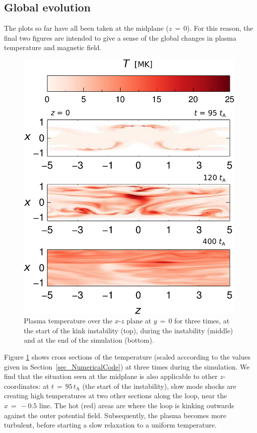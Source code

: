 \documentclass{./packages/rs/rsproca}
\begin{document}
\subsection{Global evolution}
\label{sec_NumericalResults_GlobalEvolution}

The plots so far have all been taken at the midplane ($z\,{=}\,0$). For this reason, the final two figures are intended to give a sense of the global changes in plasma temperature and magnetic field.
\begin{figure}[h!]
  \center  
  \includegraphics[scale=0.38]{./inkscape/256x256x512/xz_temp_sca}
  \caption{\small{Plasma temperature over the $x$-$z$ plane at $y\,{=}\,0$ for three times, at the start of the kink instability (top), during the instability (middle) and at the end of the simulation (bottom).}}
  \label{xz_temp}
  \vspace{-10pt}
\end{figure}
Figure \ref{xz_temp} shows cross sections of the temperature (scaled acccording to the values given in \mbox{Section \ref{sec_NumericalCode}}) at three times during the simulation. We find that the situation seen at the midplane is also applicable to other $z$-coordinates: at $t\,{=}\,95\,t_{\mathrm{A}}$ (the start of the instability), slow mode shocks are creating high temperatures at two other sections along the loop, near the $x\,{=}\,-0.5$ line. The hot (red) areas are where the loop is kinking outwards against the outer potential field. Subsequently, the plasma becomes more turbulent, before starting a slow relaxation to a uniform temperature.
\end{document}
